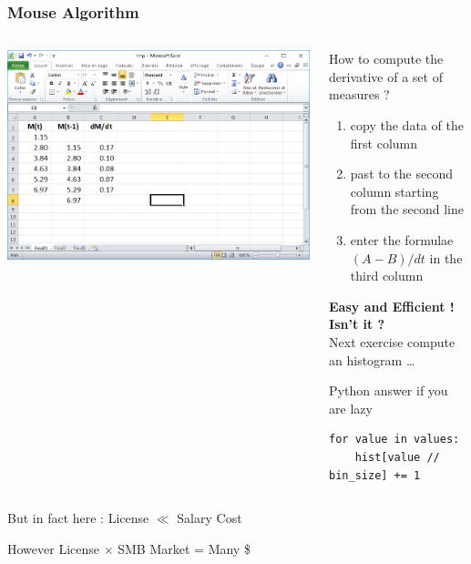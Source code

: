 \begin{frame}[fragile]
  \frametitle{Mouse Algorithm}
  \begin{columns}[T]
    \begin{column}{.4\textwidth}
      \includegraphics[width=1.\textwidth]{images/excel-sheet.png}
    \end{column}
    \begin{column}{.6\textwidth}
      \small
      How to compute the derivative of a set of measures ?
      \begin{enumerate}
      \item copy the data of the first column
      \item past to the second column starting from the second line
      \item enter the formulae $(A-B)/dt$ in the third column
      \end{enumerate}
      \textbf{Easy and Efficient ! Isn't it ? } \\[1em]
      Next exercise compute an histogram \ldots \\[1em]
      {\tiny Python answer if you are lazy
\begin{Verbatim}
for value in values:
    hist[value // bin_size] += 1
\end{Verbatim}
        }%
    \end{column}
  \end{columns}
  \vspace{3em}
  \centerline{\alert{But in fact here : License $\ll$ Salary Cost}}
  \centerline{\alert{However License $\times$ SMB Market = Many \$}}
\end{frame}

